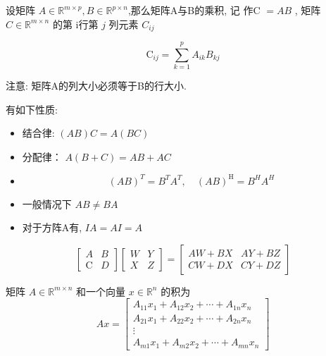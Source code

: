 \begin{definition}[矩阵乘法]
    设矩阵 $ A \in \mathbb{R}^{m \times p}, B \in \mathbb{R}^{p \times n} $,那么矩阵A与B的乘积, 记 作C $ =A B $ ,  矩阵 $ C \in \mathbb{R}^{m \times n} $ 的第 i行第 $ j $ 列元素 $ C_{i j} $

    $$
\mathrm{C}_{i j}=\sum_{k=1}^{p} A_{i k} B_{k j}
$$

\end{definition}

注意: 矩阵A的列大小必须等于B的行大小.

\begin{corollary}[矩阵乘法性质]
    有如下性质:
    \begin{itemize}
        \item 结合律: $ (A B) C=A(B C) $
        \item 分配律： $ A(B+C)=A B+A C $
        \item $$ (A B)^{T}=B^{T} A^{T}, \quad(A B)^{\mathrm{H}}=B^{H} A^{H} $$
        \item 一般情况下 $ A B \neq B A $
        \item 对于方阵A有, $ I A=A I=A $
    \end{itemize} 
\end{corollary}

\begin{definition}[分块矩阵乘法]
    $$ \left[\begin{array}{ll}A & B \\ \mathrm{C} & D\end{array}\right]\left[\begin{array}{ll}W & Y \\ X & Z\end{array}\right]=\left[\begin{array}{ll}A W+B X & A Y+B Z \\ C W+D X & C Y+D Z\end{array}\right] $$
\end{definition}

\begin{definition}[矩阵-向量乘积 $Ax$]
    矩阵 $ A \in \mathbb{R}^{m \times n} $ 和一个向量 $ x \in \mathbb{R}^{n} $ 的积为
$$
A x=\left[\begin{array}{c}
A_{11} x_{1}+A_{12} x_{2}+\cdots+A_{1 n} x_{n} \\
A_{21} x_{1}+A_{22} x_{2}+\cdots+A_{2 n} x_{n} \\
\vdots \\
A_{m 1} x_{1}+A_{m 2} x_{2}+\cdots+A_{m n} x_{n}
\end{array}\right]
$$
\end{definition}

